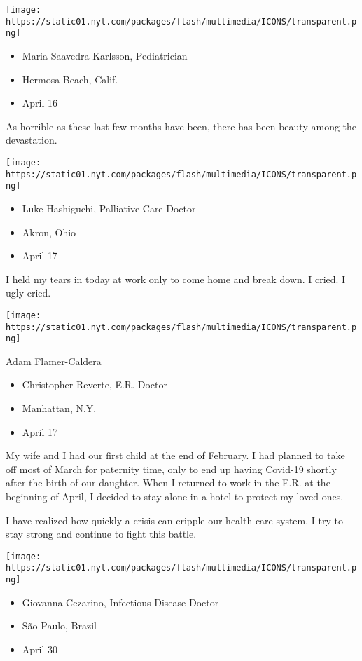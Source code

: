 \texttt{[image: https://static01.nyt.com/packages/flash/multimedia/ICONS/transparent.png]}

\begin{itemize}
\tightlist
\item
  Maria Saavedra Karlsson, Pediatrician
\item
  Hermosa Beach, Calif.
\item
  April 16
\end{itemize}

As horrible as these last few months have been, there has been beauty
among the devastation.

\texttt{[image: https://static01.nyt.com/packages/flash/multimedia/ICONS/transparent.png]}

\begin{itemize}
\tightlist
\item
  Luke Hashiguchi, Palliative Care Doctor
\item
  Akron, Ohio
\item
  April 17
\end{itemize}

I held my tears in today at work only to come home and break down. I
cried. I ugly cried.

\texttt{[image: https://static01.nyt.com/packages/flash/multimedia/ICONS/transparent.png]}

Adam Flamer-Caldera

\begin{itemize}
\tightlist
\item
  Christopher Reverte, E.R. Doctor
\item
  Manhattan, N.Y.
\item
  April 17
\end{itemize}

My wife and I had our first child at the end of February. I had planned
to take off most of March for paternity time, only to end up having
Covid-19 shortly after the birth of our daughter. When I returned to
work in the E.R. at the beginning of April, I decided to stay alone in a
hotel to protect my loved ones.

I have realized how quickly a crisis can cripple our health care system.
I try to stay strong and continue to fight this battle.

\texttt{[image: https://static01.nyt.com/packages/flash/multimedia/ICONS/transparent.png]}

\begin{itemize}
\tightlist
\item
  Giovanna Cezarino, Infectious Disease Doctor
\item
  São Paulo, Brazil
\item
  April 30
\end{itemize}

